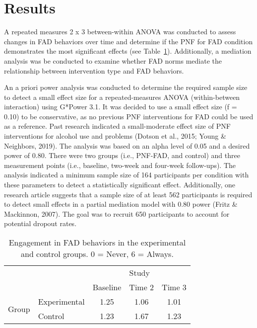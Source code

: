 \section{Results}

A repeated measures 2 x 3 between-within ANOVA was conducted to assess changes in FAD behaviors over time and determine if the PNF for FAD condition demonstrates the most significant effects (see Table~\ref{tab:study}). Additionally, a mediation analysis was be conducted to examine whether FAD norms mediate the relationship between intervention type and FAD behaviors.

An a priori power analysis was conducted to determine the required sample size to detect a small effect size for a repeated-measures ANOVA (within-between interaction) using G*Power 3.1. It was decided to use a small effect size (f = 0.10) to be conservative, as no previous PNF interventions for FAD could be used as a reference. Past research indicated a small-moderate effect size of PNF interventions for alcohol use and problems (Dotson et al., 2015; Young \& Neighbors, 2019). The analysis was based on an alpha level of 0.05 and a desired power of 0.80. There were two groups (i.e., PNF-FAD, and control) and three measurement points (i.e., baseline, two-week and four-week follow-ups). The analysis indicated a minimum sample size of 164 participants per condition with these parameters to detect a statistically significant effect. Additionally, one research article suggests that a sample size of at least 562 participants is required to detect small effects in a partial mediation model with 0.80 power (Fritz \& Mackinnon, 2007). The goal was to recruit 650 participants to account for potential dropout rates.

\begin{table}[h!]
\centering
\caption{\label{tab:study}Engagement in FAD behaviors in the experimental and control groups. 0 = Never, 6 = Always.}
\begin{tabular}{l l c c c}
 \toprule
                          &              & \multicolumn{3}{c}{Study}\\
  \cmidrule{3-5}
                          &              & {Baseline}           & {Time 2}           & {Time 3}\\
  \cmidrule{3-5}
  \multirow{ 2}{*}{Group} & Experimental &     1.25    &      1.06     &      1.01     \\
                          & Control      &     1.23      &      1.67     &      1.23   \\
  \bottomrule
 \end{tabular}
\end{table}


